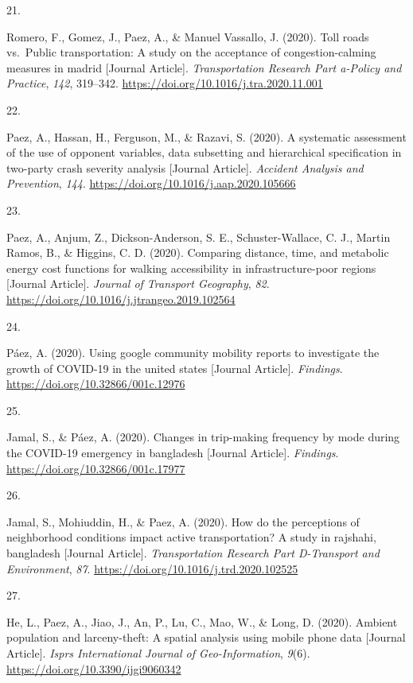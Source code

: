 \documentclass[10pt,a4paper,]{twentysecondcv}
\newlength{\csllabelwidth}
\newcommand{\CSLLeftMargin}[1]{\parbox[t]{\csllabelwidth}{#1}}
\newcommand{\CSLRightInline}[1]{\parbox[t]{\linewidth - \csllabelwidth}{#1}}
\begin{document}
\leavevmode{}%
\CSLLeftMargin{21. }%
\CSLRightInline{Romero, F., Gomez, J., Paez, A., \& Manuel Vassallo, J.
(2020). Toll roads vs.~Public transportation: A study on the acceptance
of congestion-calming measures in madrid {[}Journal Article{]}.
\emph{Transportation Research Part a-Policy and Practice}, \emph{142},
319--342. \url{https://doi.org/10.1016/j.tra.2020.11.001}}

\leavevmode{}%
\CSLLeftMargin{22. }%
\CSLRightInline{Paez, A., Hassan, H., Ferguson, M., \& Razavi, S.
(2020). A systematic assessment of the use of opponent variables, data
subsetting and hierarchical specification in two-party crash severity
analysis {[}Journal Article{]}. \emph{Accident Analysis and Prevention},
\emph{144}. \url{https://doi.org/10.1016/j.aap.2020.105666}}

\leavevmode{}%
\CSLLeftMargin{23. }%
\CSLRightInline{Paez, A., Anjum, Z., Dickson-Anderson, S. E.,
Schuster-Wallace, C. J., Martin Ramos, B., \& Higgins, C. D. (2020).
Comparing distance, time, and metabolic energy cost functions for
walking accessibility in infrastructure-poor regions {[}Journal
Article{]}. \emph{Journal of Transport Geography}, \emph{82}.
\url{https://doi.org/10.1016/j.jtrangeo.2019.102564}}

\leavevmode{}%
\CSLLeftMargin{24. }%
\CSLRightInline{Páez, A. (2020). Using google community mobility reports
to investigate the growth of COVID-19 in the united states {[}Journal
Article{]}. \emph{Findings}. \url{https://doi.org/10.32866/001c.12976}}

\leavevmode{}%
\CSLLeftMargin{25. }%
\CSLRightInline{Jamal, S., \& Páez, A. (2020). Changes in trip-making
frequency by mode during the COVID-19 emergency in bangladesh {[}Journal
Article{]}. \emph{Findings}. \url{https://doi.org/10.32866/001c.17977}}

\leavevmode{}%
\CSLLeftMargin{26. }%
\CSLRightInline{Jamal, S., Mohiuddin, H., \& Paez, A. (2020). How do the
perceptions of neighborhood conditions impact active transportation? A
study in rajshahi, bangladesh {[}Journal Article{]}.
\emph{Transportation Research Part D-Transport and Environment},
\emph{87}. \url{https://doi.org/10.1016/j.trd.2020.102525}}

\leavevmode{}%
\CSLLeftMargin{27. }%
\CSLRightInline{He, L., Paez, A., Jiao, J., An, P., Lu, C., Mao, W., \&
Long, D. (2020). Ambient population and larceny-theft: A spatial
analysis using mobile phone data {[}Journal Article{]}. \emph{Isprs
International Journal of Geo-Information}, \emph{9}(6).
\url{https://doi.org/10.3390/ijgi9060342}}
\end{document}
